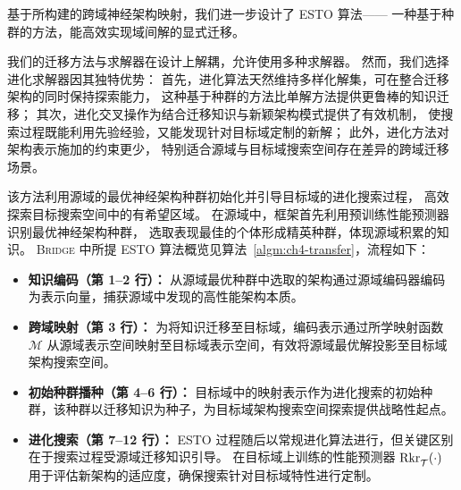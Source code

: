 \documentclass[../main.tex]{subfiles}
\begin{document}

基于所构建的跨域神经架构映射，我们进一步设计了 ESTO 算法——
一种基于种群的方法，能高效实现域间解的显式迁移。

我们的迁移方法与求解器在设计上解耦，允许使用多种求解器。
然而，我们选择进化求解器因其独特优势：
首先，进化算法天然维持多样化解集，可在整合迁移架构的同时保持探索能力，
这种基于种群的方法比单解方法提供更鲁棒的知识迁移；
其次，进化交叉操作为结合迁移知识与新颖架构模式提供了有效机制，
使搜索过程既能利用先验经验，又能发现针对目标域定制的新解；
此外，进化方法对架构表示施加的约束更少，
特别适合源域与目标域搜索空间存在差异的跨域迁移场景。

该方法利用源域的最优神经架构种群初始化并引导目标域的进化搜索过程，
高效探索目标搜索空间中的有希望区域。
在源域中，框架首先利用预训练性能预测器识别最优神经架构种群，
选取表现最佳的个体形成精英种群，体现源域积累的知识。
\textsc{Bridge} 中所提 ESTO 算法概览见算法~\ref{algm:ch4-transfer}，流程如下：
\begin{itemize}
	\item \textbf{知识编码（第 1–2 行）：} 从源域最优种群中选取的架构通过源域编码器编码为表示向量，捕获源域中发现的高性能架构本质。
	\item \textbf{跨域映射（第 3 行）：} 为将知识迁移至目标域，编码表示通过所学映射函数 $ \mathcal{M} $ 从源域表示空间映射至目标域表示空间，有效将源域最优解投影至目标域架构搜索空间。
	\item \textbf{初始种群播种（第 4–6 行）：} 目标域中的映射表示作为进化搜索的初始种群，该种群以迁移知识为种子，为目标域架构搜索空间探索提供战略性起点。
	\item \textbf{进化搜索（第 7–12 行）：} ESTO 过程随后以常规进化算法进行，但关键区别在于搜索过程受源域迁移知识引导。
	      在目标域上训练的性能预测器 $ \mathrm{Rkr}^{\mathstrut}_{\mathcal{T}}(\cdot) $ 用于评估新架构的适应度，确保搜索针对目标域特性进行定制。
\end{itemize}
\end{document}
